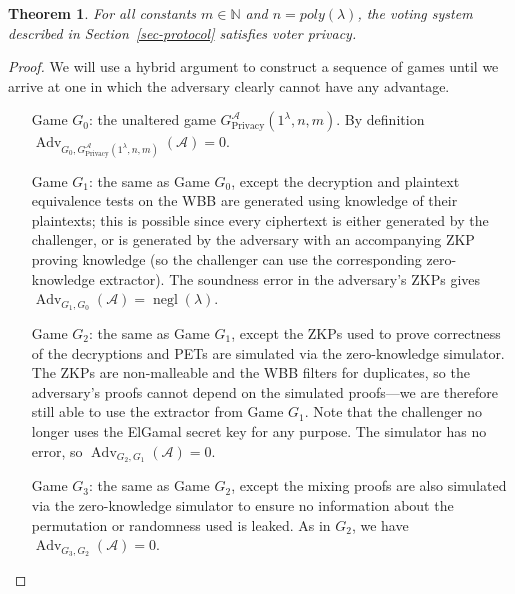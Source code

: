 \documentclass[12pt,a4paper]{article}
\DeclareMathOperator{\negl}{\text{negl}}
\DeclareMathOperator{\Adv}{\text{Adv}}
\newtheorem{theorem}{Theorem}
\theoremstyle{definition}
\begin{document}
\begin{theorem}\label{thm-privacy}
    For all constants $m \in \mathbb{N}$ and $n=poly(\lambda)$, the voting system described in Section~\ref{sec-protocol} satisfies voter privacy.
\end{theorem}
\begin{proof}
    We will use a hybrid argument to construct a sequence of games until we arrive at one in which the adversary clearly cannot have any advantage.
    \begin{itemize}[leftmargin=4em]
        \item[Game] $G_0$: the unaltered game $G^\mathcal{A}_{\text{Privacy}}(1^\lambda, n, m)$. By definition $\Adv_{G_0, G^\mathcal{A}_{\text{Privacy}}(1^\lambda, n, m)}(\mathcal{A})=0$.
        
        \item[Game] $G_1$: the same as Game $G_0$, except the decryption and plaintext equivalence tests on the WBB are generated using knowledge of their plaintexts; this is possible since every ciphertext is either generated by the challenger, or is generated by the adversary with an accompanying ZKP proving knowledge (so the challenger can use the corresponding zero-knowledge extractor). The soundness error in the adversary's ZKPs gives $\Adv_{G_1, G_0}(\mathcal{A})=\negl(\lambda)$.
 
        \item[Game] $G_2$: the same as Game $G_1$, except the ZKPs used to prove correctness of the decryptions and PETs are simulated via the zero-knowledge simulator. The ZKPs are non-malleable and the WBB filters for duplicates, so the adversary's proofs cannot depend on the simulated proofs---we are therefore still able to use the extractor from Game $G_1$. Note that the challenger no longer uses the ElGamal secret key for any purpose. The simulator has no error, so $\Adv_{G_2, G_1}(\mathcal{A})=0$.
 
        \item[Game] $G_3$: the same as Game $G_2$, except the mixing proofs are also simulated via the zero-knowledge simulator to ensure no information about the permutation or randomness used is leaked. As in $G_2$, we have $\Adv_{G_3, G_2}(\mathcal{A})=0$.
        

\end{itemize}
\end{proof}
\end{document}
